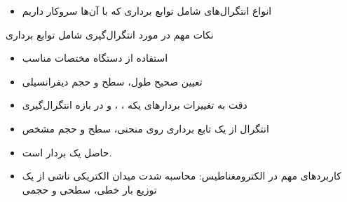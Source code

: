 \ELhold


\begin{ELunit}


\begin{itemize}
\tightlist
\item
  انواع انتگرال‌های شامل توابع برداری که با آن‌ها سروکار داریم
\end{itemize}


\end{ELunit}

\begin{ELremark}{}

نکات مهم در مورد انتگرال‌گیری شامل توابع برداری

\begin{itemize}
\tightlist
\item
  استفاده از دستگاه مختصات مناسب
\item
  تعیین صحیح طول، سطح و حجم دیفرانسیلی
\item
  دقت به تغییرات بردارهای یکه ، ، \ELim{\uvec{\theta}} و \ELim{\uvec{\phi}} در بازه انتگرال‌گیری
\end{itemize}

\end{ELremark}

\begin{ELunit}

\begin{itemize}
\tightlist
\item
  انتگرال از یک تابع برداری روی منحنی، سطح و حجم مشخص
\end{itemize}


\begin{itemize}
\tightlist
\item
  حاصل یک بردار است.
\item
  کاربردهای مهم در الکترومغناطیس: محاسبه شدت میدان الکتریکی ناشی از یک توزیع بار خطی، سطحی و حجمی
\end{itemize}


\end{ELunit}

